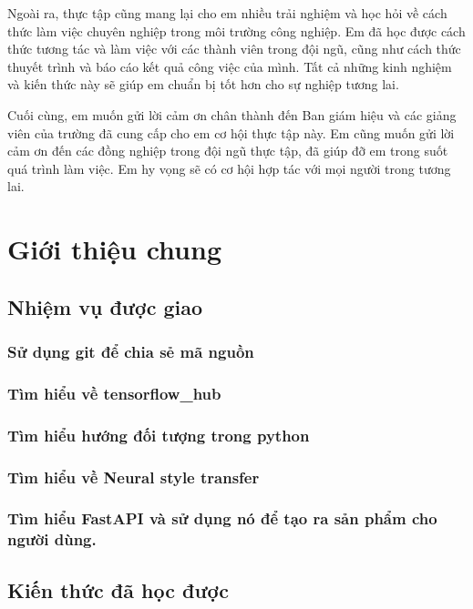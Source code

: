 \documentclass{article}
\begin{document}
\vspace{0.5cm}

\noindent Ngoài ra, thực tập cũng mang lại cho em nhiều trải nghiệm và học hỏi về cách thức làm việc chuyên nghiệp trong môi trường công nghiệp. Em đã học được cách thức tương tác và làm việc với các thành viên trong đội ngũ, cũng như cách thức thuyết trình và báo cáo kết quả công việc của mình. Tất cả những kinh nghiệm và kiến thức này sẽ giúp em chuẩn bị tốt hơn cho sự nghiệp tương lai.

\vspace{0.5cm}

\noindent Cuối cùng, em muốn gửi lời cảm ơn chân thành đến Ban giám hiệu và các giảng viên của trường đã cung cấp cho em cơ hội thực tập này. Em cũng muốn gửi lời cảm ơn đến các đồng nghiệp trong đội ngũ thực tập, đã giúp đỡ em trong suốt quá trình làm việc. Em hy vọng sẽ có cơ hội hợp tác với mọi người trong tương lai.

\newpage
{}
\vspace{0.5cm}
\section{Giới thiệu chung}
\subsection{Nhiệm vụ được giao}
\subsubsection{Sử dụng git để chia sẻ mã nguồn}
\subsubsection{Tìm hiểu về tensorflow_hub}
\subsubsection{Tìm hiểu hướng đối tượng trong python}
\subsubsection{Tìm hiểu về Neural style transfer}
\subsubsection{Tìm hiểu FastAPI và sử dụng nó để tạo ra sản phẩm cho người dùng.}

\subsection{Kiến thức đã học được}
\end{document}
